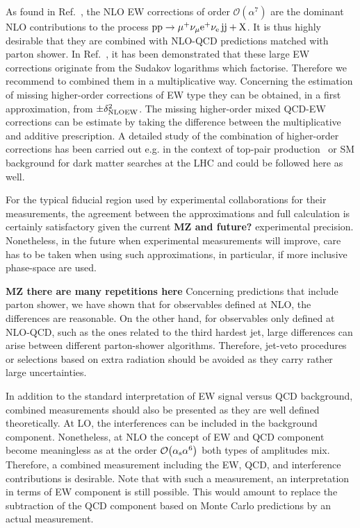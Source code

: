 As found in Ref.~\cite{Biedermann:2017bss}, the NLO EW corrections of order $\mathcal{O}{\left(\alpha^{7}\right)}$ are the dominant NLO contributions to the process $\text{p}\text{p}\to\mu^+\nu_\mu{\rm e}^+\nu_{\rm e}\,\text{j}\text{j}+\mathrm{X}$.
It is thus highly desirable that they are combined with NLO-QCD predictions matched with parton shower.
In Ref.~\cite{Biedermann:2016yds}, it has been demonstrated that these large EW corrections originate from the Sudakov logarithms which factorise.
Therefore we recommend to combined them in a multiplicative way.
Concerning the estimation of missing higher-order corrections of EW type they can be obtained, in a first approximation, from $\pm \delta^2_{\rm NLO EW}$.
The missing higher-order mixed QCD-EW corrections can be estimate by taking the difference between the multiplicative and additive prescription.
A detailed study of the combination of higher-order corrections has been carried out e.g. in the context of top-pair production~\cite{Czakon:2017wor} or SM 
background for dark matter searches at the LHC \cite{Lindert:2017olm} and could be followed here as well.

For the typical fiducial region used by experimental collaborations for their measurements, the agreement between the approximations and full calculation is certainly satisfactory given the current {\bf MZ and future?} experimental precision.
Nonetheless, in the future when experimental measurements will improve, care has to be taken when using such approximations, in particular, if more inclusive phase-space are used.

{\bf MZ there are many repetitions here}
Concerning predictions that include parton shower, we have shown that for observables defined at NLO, the differences are reasonable.
On the other hand, for observables only defined at NLO-QCD, such as the ones related to the third hardest jet, large differences can arise between different parton-shower algorithms.
Therefore, jet-veto procedures or selections based on extra radiation should be avoided as they carry rather large uncertainties.

In addition to the standard interpretation of EW signal versus QCD background, combined measurements should also be presented as they are well defined theoretically.
At LO, the interferences can be included in the background component.
Nonetheless, at NLO the concept of EW and QCD component become meaningless as at the order $\mathcal{O}{\left(\alpha_\text{s}\alpha^{6}\right)}$ both types of amplitudes mix.
Therefore, a combined measurement including the EW, QCD, and interference contributions is desirable.
Note that with such a measurement, an interpretation in terms of EW component is still possible.
This would amount to replace the subtraction of the QCD component based on Monte Carlo predictions by an actual measurement.


